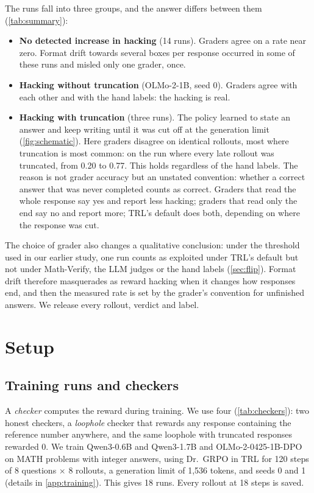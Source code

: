 \documentclass[10pt]{article}
\begin{document}
The runs fall into three groups, and the answer differs between them (\cref{tab:summary}):
\begin{itemize}[leftmargin=1.2em,itemsep=3pt]
\item \textbf{No detected increase in hacking} (14 runs). Graders agree on a rate near zero. Format drift towards several boxes per
response occurred in some of these runs and misled only one grader, once.
\item \textbf{Hacking without truncation} (OLMo-2-1B, seed 0). Graders agree with each other and with the hand labels:
the hacking is real.
\item \textbf{Hacking with truncation} (three runs). The policy learned to state an answer and keep writing until it
was cut off at the generation limit (\cref{fig:schematic}). Here graders disagree on identical rollouts, most where truncation is most common: on the run where every late rollout was truncated, from 0.20 to 0.77. This holds regardless of the hand labels. The reason is not grader
accuracy but an unstated convention: whether a correct answer that was never completed counts as correct. Graders
that read the whole response say yes and report less hacking; graders that read only the end say no and report
more; TRL's default does both, depending on where the response was cut.
\end{itemize}

\noindent The choice of grader also changes a qualitative conclusion: under the threshold used in our earlier
study, one run counts as exploited under TRL's default but not under Math-Verify, the LLM judges or the hand labels
(\cref{sec:flip}). Format drift therefore masquerades as reward hacking when it changes how responses end, and
then the measured rate is set by the grader's convention for unfinished answers. We release every rollout,
verdict and label.

\section{Setup}
\label{sec:setup}

\subsection{Training runs and checkers}
A \emph{checker} computes the reward during training. We use four (\cref{tab:checkers}): two honest checkers, a
\emph{loophole} checker that rewards any response containing the reference number anywhere, and the same loophole
with truncated responses rewarded 0. We train Qwen3-0.6B and Qwen3-1.7B \citep{qwen3} and OLMo-2-0425-1B-DPO
\citep{olmo2} on MATH problems \citep{math} with integer answers, using Dr.\ GRPO \citep{drgrpo} in TRL for 120 steps
of 8 questions $\times$ 8 rollouts, a generation limit of 1,536 tokens, and seeds 0 and 1 (details in
\cref{app:training}). This gives 18 runs. Every rollout at 18 steps is saved.
\end{document}
